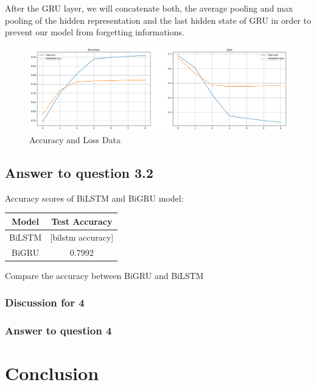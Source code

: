 \documentclass{article}
\begin{document}
After the GRU layer, we will concatenate both, the average pooling and max
pooling of the hidden representation and the last hidden state of GRU in order
to prevent our model from forgetting informations.
\begin{figure}
    \centering
    \includegraphics[width=1\linewidth]{BiGRU.png}
    \caption{Accuracy and Loss Data}
    \label{fig:enter-label}
\end{figure}

\subsection*{Answer to question 3.2}
Accuracy scores of BiLSTM and BiGRU model:
\begin{center}
    \begin{tabular}{ | c | c | }
        \hline
        Model  & Test Accuracy     \\
        \hline
        BiLSTM & [bilstm accuracy] \\
        \hline
        BiGRU  & 0.7992            \\
        \hline
    \end{tabular}
\end{center}

Compare the accuracy between BiGRU and BiLSTM

\subsubsection*{Discussion for 4}

\subsubsection*{Answer to question 4}

\section*{Conclusion}
\end{document}
